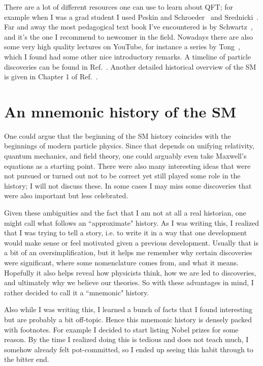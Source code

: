 There are a lot
of different resources one can use to learn about QFT; for example when I was a
grad student I used Peskin and Schroeder~\cite{peskin_introduction_1995}
and Srednicki~\cite{srednicki_quantum_2007}. Far and away the most pedagogical
text book I've encountered is by Schwartz~\cite{schwartz_quantum_2014}, and it's
the one I recommend to newcomer in the field.
Nowadays there are also some very high quality lectures on YouTube,
for instance a series by Tong~\cite{tongQFT}, which I found had some other nice
introductory remarks. 
A timeline of particle discoveries can be found in
Ref.~\cite{wiki_particle_discoveries}. Another detailed historical overview
of the SM is given in Chapter 1 of Ref.~\cite{griffiths_introduction_2007}.

\section{An mnemonic history of the SM}

One could argue that the beginning of the SM history coincides with the
beginnings of modern particle physics. Since that depends on unifying
relativity, quantum mechanics, and field theory, one could arguably even take
Maxwell's equations as a starting point. 
There were also many interesting ideas that were not pursued or turned out
not to be correct yet still played some role in the history; I will not
discuss these. In some cases I may miss some discoveries that were also
important but less celebrated.

Given these ambiguities and the fact
that I am not at all a real historian, 
one might call what follows an ``approximate" history.
As I was writing this, I realized that I was trying to tell a story, i.e.
to write it in a way that one development would make sense or feel
motivated given a previous development. Usually that is a bit of an
oversimplification, but it helps me remember why certain discoveries were
significant, where some nomenclature comes from, and what it means. Hopefully it
also helps reveal how physicists think, how we are led to discoveries, and
ultimately why we believe our theories. So with these advantages in mind, I
rather decided to call it a ``mnemonic" history. 

Also while I was writing this, I learned a bunch of facts that I found
interesting but are probably a bit off-topic. Hence this mnemonic history is
densely packed with footnotes. For example I decided to start listing Nobel
prizes for some reason. By the time I realized doing this is tedious and does not
teach much, I somehow already felt pot-committed, so I ended up seeing this habit
through to the bitter end. 

